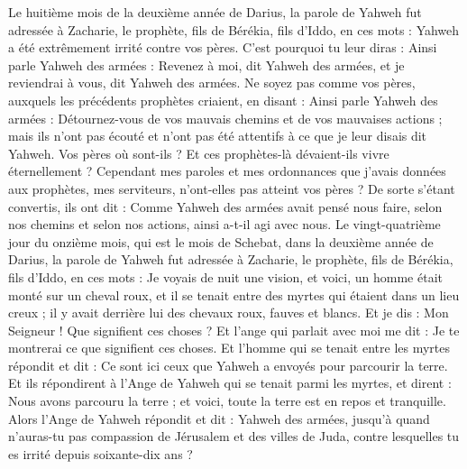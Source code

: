 \begin{multicols}{2}
\VerseOne{}Le huitième mois de la deuxième année de Darius, la parole de Yahweh fut adressée à Zacharie, le prophète, fils de Bérékia, fils d'Iddo, en ces mots :
Yahweh a été extrêmement irrité contre vos pères.
C'est pourquoi tu leur diras : Ainsi parle Yahweh des armées : Revenez à moi, dit Yahweh des armées, et je reviendrai à vous, dit Yahweh des armées.
Ne soyez pas comme vos pères, auxquels les précédents prophètes criaient, en disant : Ainsi parle Yahweh des armées : Détournez-vous de vos mauvais chemins et de vos mauvaises actions ; mais ils n’ont pas écouté et n'ont pas été attentifs à ce que je leur disais dit Yahweh.
Vos pères où sont-ils ? Et ces prophètes-là dévaient-ils vivre éternellement ?
Cependant mes paroles et mes ordonnances que j'avais données aux prophètes, mes serviteurs, n'ont-elles pas atteint vos pères ? De sorte s'étant convertis, ils ont dit : Comme Yahweh des armées avait pensé nous faire, selon nos chemins et selon nos actions, ainsi a-t-il agi avec nous.
Le vingt-quatrième jour du onzième mois, qui est le mois de Schebat, dans la deuxième année de Darius, la parole de Yahweh fut adressée à Zacharie, le prophète, fils de Bérékia, fils d'Iddo, en ces mots :
Je voyais de nuit une vision, et voici, un homme était monté sur un cheval roux, et il se tenait entre des myrtes qui étaient dans un lieu creux ; il y avait derrière lui des chevaux roux, fauves et blancs.
Et je dis : Mon Seigneur ! Que signifient ces choses ? Et l'ange qui  parlait avec moi me dit : Je te montrerai ce que signifient ces choses.
Et l'homme qui se tenait entre les myrtes répondit et dit : Ce sont ici ceux que Yahweh a envoyés pour parcourir la terre.
Et ils répondirent à l'Ange de Yahweh qui se tenait parmi les myrtes, et dirent : Nous avons parcouru la terre ; et voici, toute la terre est en repos et tranquille.
Alors l'Ange de Yahweh répondit et dit : Yahweh des armées, jusqu'à quand n'auras-tu pas compassion de Jérusalem et des villes de Juda, contre lesquelles tu es irrité depuis soixante-dix ans ?

\end{multicols}
